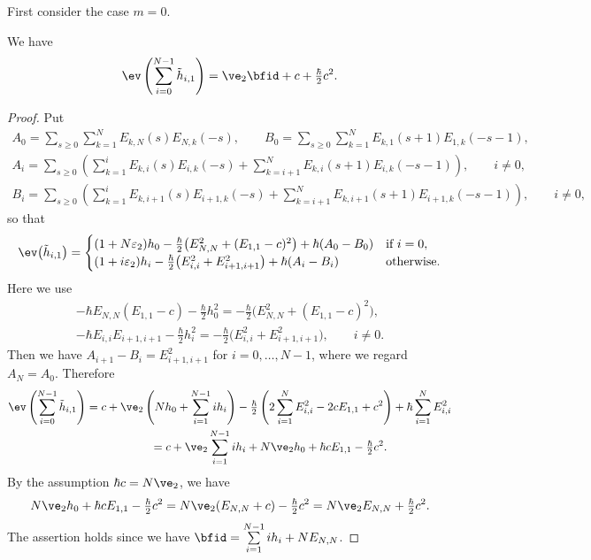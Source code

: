First consider the case $m=0$.
\begin{prop}\label{prop:zero-mode} We have
\begin{gather*} \ev \left( \sum_{i=0}^{N-1} \tilde{h}_{i,1} \right)= \ve_2 \bfid + c + \tfrac{\hbar}{2} c^2.
\end{gather*}
\end{prop}
\begin{proof}
Put
\begin{gather*}
A_0 = \sum_{s \geq 0} \sum_{k=1}^N E_{k,N}(s)E_{N,k}(-s),\qquad
B_0 = \sum_{s \geq 0} \sum_{k=1}^N E_{k,1}(s+1)E_{1,k}(-s-1),\\
A_i = \sum_{s \geq 0} \left( \sum_{k=1}^i E_{k,i}(s)E_{i,k}(-s) + \sum_{k=i+1}^N E_{k,i}(s+1)E_{i,k}(-s-1) \right), \qquad i \neq 0,\\
B_i = \sum_{s \geq 0} \left( \sum_{k=1}^i E_{k,i+1}(s)E_{i+1,k}(-s) + \sum_{k=i+1}^N E_{k,i+1}(s+1)E_{i+1,k}(-s-1) \right), \qquad i \neq 0,
\end{gather*}
so that
\begin{gather*}
\ev\big(\tilde{h}_{i,1}\big) = \begin{cases}
(1+ N \varepsilon_2) h_{0} - \tfrac{\hbar}{2} \big(E_{N,N}^2 + (E_{1,1}-c)^2\big) + \hbar(A_0-B_0)& \text{if $i=0$},\\
(1+ i \varepsilon_2) h_{i} - \tfrac{\hbar}{2} \big(E_{i,i}^2 + E_{i+1,i+1}^2\big) + \hbar(A_i-B_i)& \text{otherwise}.
\end{cases}
\end{gather*}
Here we use
\begin{gather*}
-\hbar E_{N,N}(E_{1,1}-c) - \tfrac{\hbar}{2} h_0^2 = - \tfrac{\hbar}{2} \big(E_{N,N}^2 + (E_{1,1}-c)^2\big),\\
-\hbar E_{i,i} E_{i+1,i+1} - \tfrac{\hbar}{2} h_i^2 = - \tfrac{\hbar}{2} \big(E_{i,i}^2 + E_{i+1,i+1}^2\big), \qquad i \neq 0.
\end{gather*}
Then we have $A_{i+1}-B_{i}=E_{i+1,i+1}^2$ for $i=0,\ldots,N-1$, where we regard $A_N=A_0$.
Therefore
\begin{gather*}
\ev \left( \sum_{i=0}^{N-1} \tilde{h}_{i,1} \right)= c + \ve_2 \left(N h_0 + \sum_{i=1}^{N-1} i h_i\right) -\tfrac{\hbar}{2}\left( 2\sum_{i=1}^N E_{i,i}^2 - 2cE_{1,1} + c^2\right) + \hbar \sum_{i=1}^N E_{i,i}^2 \\
\hphantom{\ev \left( \sum_{i=0}^{N-1} \tilde{h}_{i,1} \right)}{} = c + \ve_2 \sum_{i=1}^{N-1} i h_i + N \ve_2 h_0 + \hbar c E_{1,1} - \tfrac{\hbar}{2}c^2.
\end{gather*}
By the assumption $\hbar c = N\ve_2$, we have
\begin{gather*}
N \ve_2 h_0 + \hbar c E_{1,1} - \tfrac{\hbar}{2}c^2 = N \ve_2 (E_{N,N} + c) - \tfrac{\hbar}{2}c^2 = N \ve_2 E_{N,N} + \tfrac{\hbar}{2}c^2.
\end{gather*}
The assertion holds since we have $\bfid = \sum\limits_{i=1}^{N-1} i h_i + NE_{N,N}$.
\end{proof}

